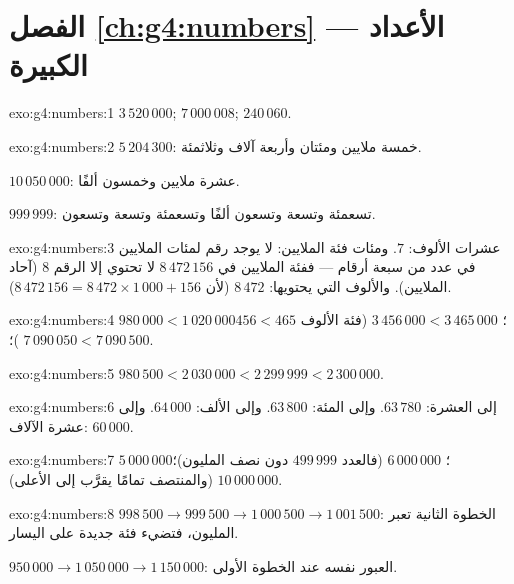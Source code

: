 \section*{الفصل \ref{ch:g4:numbers} --- الأعداد الكبيرة}

\begin{solution}{exo:g4:numbers:1}
$3\,520\,000$; \quad $7\,000\,008$; \quad $240\,060$.
\end{solution}

\begin{solution}{exo:g4:numbers:2}
$5\,204\,300$: خمسة ملايين ومئتان وأربعة آلاف وثلاثمئة.

$10\,050\,000$: عشرة ملايين وخمسون ألفًا.

$999\,999$: تسعمئة وتسعة وتسعون ألفًا وتسعمئة وتسعة
وتسعون.
\end{solution}

\begin{solution}{exo:g4:numbers:3}
عشرات الألوف: $7$. ومئات فئة الملايين: لا يوجد رقم لمئات
الملايين في عدد من سبعة أرقام --- ففئة الملايين في
$8\,472\,156$ لا تحتوي إلا الرقم $8$ (آحاد
الملايين). والألوف التي يحتويها: $8\,472$ (لأن
$8\,472\,156 = 8\,472 \times 1\,000 + 156$).
\end{solution}

\begin{solution}{exo:g4:numbers:4}
$980\,000 < 1\,020\,000$؛ \quad
$3\,456\,000 < 3\,465\,000$ (فئة الألوف $456 < 465$)؛ \quad
$7\,090\,050 < 7\,090\,500$.
\end{solution}

\begin{solution}{exo:g4:numbers:5}
$980\,500 < 2\,030\,000 < 2\,299\,999 < 2\,300\,000$.
\end{solution}

\begin{solution}{exo:g4:numbers:6}
إلى العشرة: $63\,780$. وإلى المئة: $63\,800$. وإلى الألف:
$64\,000$. وإلى عشرة الآلاف: $60\,000$.
\end{solution}

\begin{solution}{exo:g4:numbers:7}
$5\,000\,000$؛ \quad $6\,000\,000$ (فالعدد $499\,999$ دون
نصف المليون)؛ \quad $10\,000\,000$ (والمنتصف تمامًا يقرَّب إلى الأعلى).
\end{solution}

\begin{solution}{exo:g4:numbers:8}
$998\,500 \to 999\,500 \to 1\,000\,500 \to 1\,001\,500$: الخطوة
الثانية تعبر المليون، فتضيء فئة جديدة على اليسار.

$950\,000 \to 1\,050\,000 \to 1\,150\,000$: العبور نفسه عند
الخطوة الأولى.
\end{solution}

